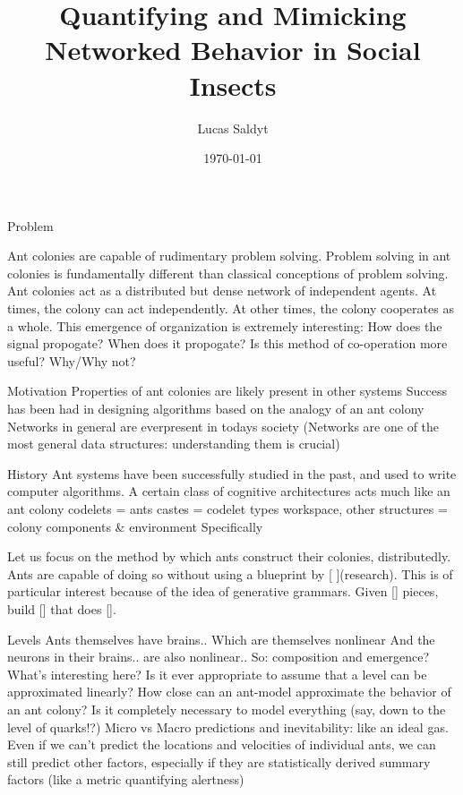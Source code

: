 \documentclass{beamer}
\title{Quantifying and Mimicking Networked Behavior in Social Insects}
\date{\today}
\author{Lucas Saldyt}
\institute{Arizona State University}
\begin{document}
  \maketitle
  \begin{frame}{Problem}
      \begin{enumerate}
      Ant colonies are capable of rudimentary problem solving.
      Problem solving in ant colonies is fundamentally different than classical conceptions of problem solving.
      Ant colonies act as a distributed but dense network of independent agents.
      At times, the colony can act independently.
      At other times, the colony cooperates as a whole.
      This emergence of organization is extremely interesting:
      How does the signal propogate?
      When does it propogate?
      Is this method of co-operation more useful? Why/Why not?
      \end{enumerate}
       
  \end{frame}
  \begin{frame}{Motivation}
      Properties of ant colonies are likely present in other systems
      Success has been had in designing algorithms based on the analogy of an ant colony
      Networks in general are everpresent in todays society
      (Networks are one of the most general data structures: understanding them is crucial)
  \end{frame}

  \begin{frame}{History}
      Ant systems have been successfully studied in the past, and used to write computer algorithms.
      A certain class of cognitive architectures acts much like an ant colony
      codelets = ants
      castes = codelet types
      workspace, other structures = colony components & environment
      Specifically

      Let us focus on the method by which ants construct their colonies, distributedly.
      Ants are capable of doing so without using a blueprint by [ ](research).
      This is of particular interest because of the idea of generative grammars.
      Given [] pieces, build [] that does [].
  \end{frame}
  \begin{frame}{Levels}
      Ants themselves have brains..
      Which are themselves nonlinear
      And the neurons in their brains.. are also nonlinear..
      So: composition and emergence? What's interesting here?
      Is it ever appropriate to assume that a level can be approximated linearly? 
      How close can an ant-model approximate the behavior of an ant colony?
      Is it completely necessary to model everything (say, down to the level of quarks!?)
      Micro vs Macro predictions and inevitability: like an ideal gas.
      Even if we can't predict the locations and velocities of individual ants, we can still predict other factors, especially if they are statistically derived summary factors (like a metric quantifying alertness)
  \end{frame}
\end{document}
